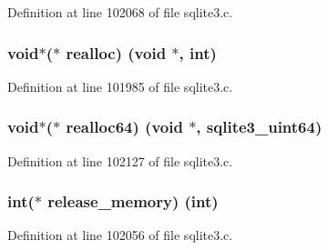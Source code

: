 Definition at line 102068 of file sqlite3.\+c.

\hypertarget{structsqlite3__api__routines_a8fda0095e70860055f3a94fd229fcc77}{}
\subsubsection[{realloc}]{\setlength{\rightskip}{0pt plus 5cm}void$\ast$($\ast$ realloc) (void $\ast$, int)}\label{structsqlite3__api__routines_a8fda0095e70860055f3a94fd229fcc77}


Definition at line 101985 of file sqlite3.\+c.

\hypertarget{structsqlite3__api__routines_a8b1ea7659f5ba58a60afd4c83b012c4a}{}
\subsubsection[{realloc64}]{\setlength{\rightskip}{0pt plus 5cm}void$\ast$($\ast$ realloc64) (void $\ast$, {\bf sqlite3\+\_\+uint64})}\label{structsqlite3__api__routines_a8b1ea7659f5ba58a60afd4c83b012c4a}


Definition at line 102127 of file sqlite3.\+c.

\hypertarget{structsqlite3__api__routines_a2275a7d0406cec003d58bdb60747493c}{}
\subsubsection[{release\+\_\+memory}]{\setlength{\rightskip}{0pt plus 5cm}int($\ast$ release\+\_\+memory) (int)}\label{structsqlite3__api__routines_a2275a7d0406cec003d58bdb60747493c}


Definition at line 102056 of file sqlite3.\+c.

\hypertarget{structsqlite3__api__routines_a9306f6bfcddcbc6d67a69c8139e6cef6}{}
